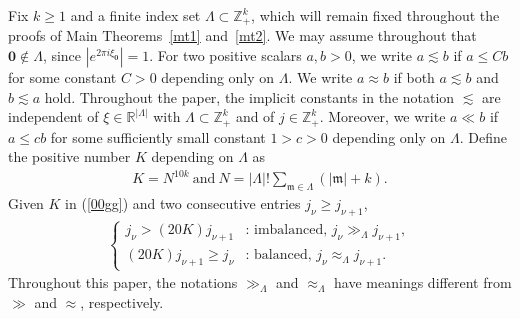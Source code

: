\documentclass[10pt,a4paper]{amsart}
\numberwithin{equation}{section}
\begin{document}
Fix $k\geq 1$ and a finite index set
$\Lambda\subset\mathbb{Z}_+^k$, which will remain fixed throughout the proofs of
Main Theorems~\ref{mt1} and~\ref{mt2}.
We may assume throughout that $\mathbf{0} \notin \Lambda$,
since $|e^{2\pi i \xi_{\mathbf{0}}}| = 1$. For two positive scalars $a,b>0$, we write $a \lesssim b$ if
$a \le C b$ for some constant $C>0$ depending only on $\Lambda$.
We write $a\approx b$ if both $a\lesssim b$ and $b\lesssim a$ hold.
Throughout the paper, the implicit constants in the notation $\lesssim$
are independent of $\xi \in \mathbb{R}^{|\Lambda|}$ with
$\Lambda \subset \mathbb{Z}_+^{k}$ and of $j \in \mathbb{Z}_+^{k}$.
Moreover, we write $a \ll b$ if 
$a \leq cb$ for some sufficiently small constant $1>c>0$ depending only on $\Lambda$. Define  the positive number $K$ depending on $\Lambda$ as
   \begin{align}\label{00gg}
   	K=N^{10k}\ \text{and}\ N=\lvert\Lambda\rvert!\sum_{\mathfrak{m}\in \Lambda} (|\mathfrak{m}|+k).
   \end{align}
  Given  $K$  in (\ref{00gg}) and two consecutive entries $j_\nu\ge j_{\nu+1}$,
\begin{align}\label{balance}
	\begin{cases}
		j_\nu>(20K)j_{\nu+1} &\text{: imbalanced, } j_\nu\gg_\Lambda j_{\nu+1},\\
		(20K)j_{\nu+1}\ge j_\nu &\text{: balanced, } j_\nu\approx_\Lambda j_{\nu+1}.
	\end{cases}
\end{align}
Throughout this paper, the notations $\gg_{\Lambda}$ and $\approx_{\Lambda}$ have meanings different from $\gg$ and $\approx$, respectively.
   
\end{document}
